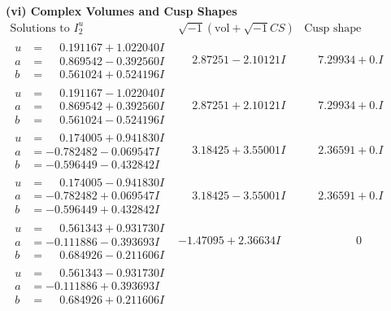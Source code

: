 \documentclass[1p]{elsarticle_modified}
\theoremstyle{definition}
\newcommand{\I}{\sqrt{-1}}
\begin{document}
\newpage\flushleft \textbf{(vi) Complex Volumes and Cusp Shapes}
$$\begin{array}{c|c|c}  
\text{Solutions to }I^u_{2}& \I (\text{vol} + \sqrt{-1}CS) & \text{Cusp shape}\\
 \hline 
\begin{aligned}
u &= \phantom{-}0.191167 + 1.022040 I \\
a &= \phantom{-}0.869542 - 0.392560 I \\
b &= \phantom{-}0.561024 + 0.524196 I\end{aligned}
 & \phantom{-}2.87251 - 2.10121 I & \phantom{-}7.29934 + 0. I\phantom{ +0.000000I} \\ \hline\begin{aligned}
u &= \phantom{-}0.191167 - 1.022040 I \\
a &= \phantom{-}0.869542 + 0.392560 I \\
b &= \phantom{-}0.561024 - 0.524196 I\end{aligned}
 & \phantom{-}2.87251 + 2.10121 I & \phantom{-}7.29934 + 0. I\phantom{ +0.000000I} \\ \hline\begin{aligned}
u &= \phantom{-}0.174005 + 0.941830 I \\
a &= -0.782482 - 0.069547 I \\
b &= -0.596449 - 0.432842 I\end{aligned}
 & \phantom{-}3.18425 + 3.55001 I & \phantom{-}2.36591 + 0. I\phantom{ +0.000000I} \\ \hline\begin{aligned}
u &= \phantom{-}0.174005 - 0.941830 I \\
a &= -0.782482 + 0.069547 I \\
b &= -0.596449 + 0.432842 I\end{aligned}
 & \phantom{-}3.18425 - 3.55001 I & \phantom{-}2.36591 + 0. I\phantom{ +0.000000I} \\ \hline\begin{aligned}
u &= \phantom{-}0.561343 + 0.931730 I \\
a &= -0.111886 - 0.393693 I \\
b &= \phantom{-}0.684926 - 0.211606 I\end{aligned}
 & -1.47095 + 2.36634 I & \phantom{-0.000000 } 0 \\ \hline\begin{aligned}
u &= \phantom{-}0.561343 - 0.931730 I \\
a &= -0.111886 + 0.393693 I \\
b &= \phantom{-}0.684926 + 0.211606 I\end{aligned}

\end{array}$$
\end{document}
